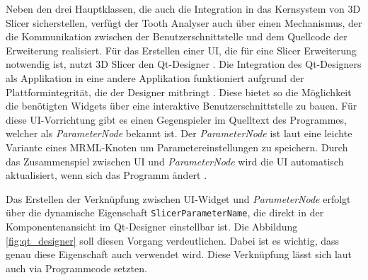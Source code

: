Neben den drei Hauptklassen, die auch die Integration in das Kernsystem von 3D Slicer
sicherstellen, verfügt der Tooth Analyser auch über einen Mechanismus, der die Kommunikation
zwischen der Benutzerschnittstelle und dem Quellcode der Erweiterung realisiert.
Für das Erstellen einer \ac{UI}, die für eine Slicer Erweiterung notwendig ist, nutzt
3D Slicer den Qt-Designer \citep[vgl.][]{qt2024}. Die Integration des Qt-Designers
als Applikation in eine andere Applikation funktioniert aufgrund der Plattformintegrität,
die der Designer mitbringt \citep[vgl.][]{qt2024}. Diese bietet so die
Möglichkeit die benötigten Widgets über eine interaktive Benutzerschnittstelle
zu bauen. Für diese \ac{UI}-Vorrichtung gibt es einen Gegenspieler im Quelltext
des Programmes, welcher als \textit{ParameterNode} bekannt ist. Der \textit{ParameterNode}
ist laut \citet{slicer2024} eine leichte Variante eines \ac{MRML}-Knoten um
Parametereinstellungen zu speichern. Durch das Zusammenspiel zwischen \ac{UI}
und \textit{ParameterNode} wird die \ac{UI} automatisch aktualisiert, wenn sich das
Programm ändert \citep[vgl.][]{slicer2024}.

Das Erstellen der Verknüpfung zwischen \ac{UI}-Widget und \textit{ParameterNode}
erfolgt über die dynamische Eigenschaft \texttt{SlicerParameterName}, die direkt
in der Komponentenansicht im Qt-Designer einstellbar ist. Die Abbildung \ref{fig:qt_designer}
soll diesen Vorgang verdeutlichen. Dabei ist es wichtig, dass genau diese Eigenschaft
auch verwendet wird. Diese Verknüpfung lässt sich laut \citet{slicer2024} auch via
Programmcode setzten.

